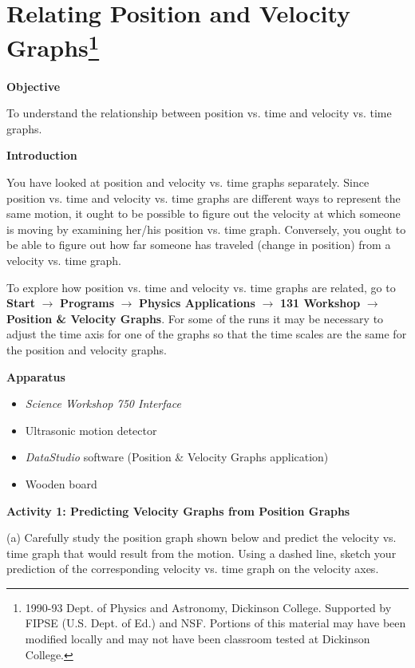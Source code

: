 
\section{Relating Position and Velocity Graphs\footnote{
1990-93 Dept. of Physics and Astronomy, Dickinson College. Supported by FIPSE
(U.S. Dept. of Ed.) and NSF. Portions of this material may have been modified
locally and may not have been classroom tested at Dickinson College.
}}

\makelabheader %

\textbf{Objective }

To understand the relationship between position vs. time and velocity vs. time
graphs.

\textbf{Introduction} 

You have looked at position and velocity vs. time graphs separately. Since position
vs. time and velocity vs. time graphs are different ways to represent the same
motion, it ought to be possible to figure out the velocity at which someone
is moving by examining her/his position vs. time graph. Conversely, you ought
to be able to figure out how far someone has traveled (change in position) from
a velocity vs. time graph.

To explore how position vs. time and velocity vs. time graphs are related, go to \textbf{Start} $\rightarrow$ \textbf{Programs} $\rightarrow$ \textbf{Physics Applications} $\rightarrow$ \textbf{131 Workshop} $\rightarrow$ \textbf{Position \& Velocity Graphs}. For some of the runs it may be necessary to adjust the time axis for one of the graphs so that the time scales are the same for the position and velocity graphs.

\vspace{5mm}

\textbf{Apparatus} 

\begin{itemize}
\item \textit{Science Workshop 750 Interface}
\item Ultrasonic motion detector 
\item \textit{DataStudio} software (Position \& Velocity Graphs application)
\item Wooden board
\end{itemize}
\textbf{Activity 1: Predicting Velocity Graphs from Position Graphs} 

(a) Carefully study the position graph shown below and predict the velocity
vs. time graph that would result from the motion. Using a dashed line, sketch
your prediction of the corresponding velocity vs. time graph on the velocity
axes.

